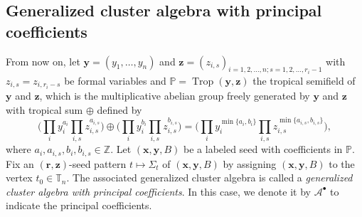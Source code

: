 \documentclass[11pt]{article}
\numberwithin{equation}{section}
\newcommand{\Z}{\mathbb{Z}}
\numberwithin{equation}{section}
\begin{document}
\subsection{Generalized cluster algebra with principal coefficients}\label{ss:principal-gca}

From now on, let $\mathbf{y}=(y_1,\dots, y_n)$ and $\mathbf{z}=(z_{i,s})_{i=1,2,\dots,n;s=1,2,\dots,r_i-1}$ with $z_{i,s}=z_{i,r_{i}-s}$ be formal variables and $\mathbb{P}=\operatorname{Trop}(\mathbf{y},\mathbf{z})$ the tropical semifield of $\mathbf{y}$ and $\mathbf{z}$, which is the multiplicative abelian group freely
generated by $\mathbf{y}$ and $\mathbf{z}$ with tropical sum $\oplus$ defined by
\begin{equation*}
\biggl(\prod\limits_{i}y_i^{a_i}\prod\limits_{i,s}z_{i,s}^{a_{i,s}}\biggr)\oplus\biggl(\prod\limits_{i}y_i^{b_i}\prod\limits_{i,s}z_{i,s}^{b_{i,s}}\biggr)=\biggl(\prod\limits_{i}y_i^{\min\{a_i,b_i\}}\prod\limits_{i,s}z_{i,s}^{\min\{a_{i,s},b_{i,s}\}}\biggr),
\end{equation*}
where $a_i,a_{i,s},b_i,b_{i,s}\in \Z$. Let $(\mathbf{x},\mathbf{y}, B)$ be a labeled seed with coefficients in $\mathbb{P}$. Fix an $(\mathbf{r},\mathbf{z})$-seed pattern $t\mapsto \Sigma_t$ of $(\mathbf{x},\mathbf{y}, B)$ by assigning $(\mathbf{x},\mathbf{y}, B)$ to the vertex $t_0\in \mathbb{T}_n$. The associated generalized cluster algebra is called a {\it generalized cluster algebra with principal coefficients}. In this case, we denote it by $\mathcal{A}^\bullet$ to indicate the principal coefficients.
\end{document}
